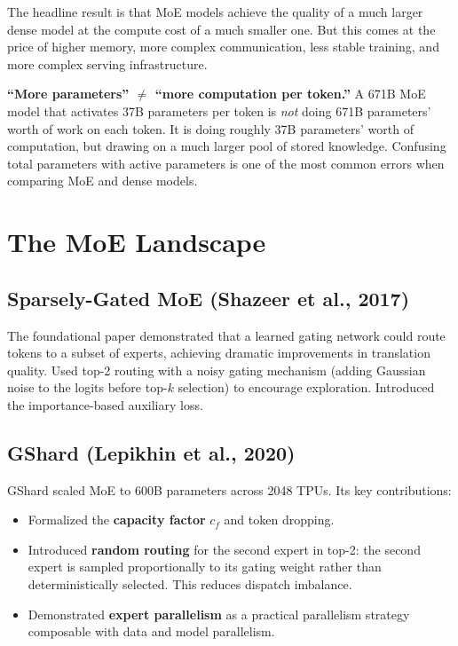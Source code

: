 The headline result is that MoE models achieve the quality of a much larger dense model at the compute cost of a much smaller one. But this comes at the price of higher memory, more complex communication, less stable training, and more complex serving infrastructure.

\begin{warningbox}
\textbf{``More parameters'' $\neq$ ``more computation per token.''} A 671B MoE model that activates 37B parameters per token is \emph{not} doing 671B parameters' worth of work on each token. It is doing roughly 37B parameters' worth of computation, but drawing on a much larger pool of stored knowledge. Confusing total parameters with active parameters is one of the most common errors when comparing MoE and dense models.
\end{warningbox}

\section{The MoE Landscape}
\label{ch:13:sec:landscape}

\subsection{Sparsely-Gated MoE (Shazeer et al., 2017)}
The foundational paper \cite{moe_2017} demonstrated that a learned gating network could route tokens to a subset of experts, achieving dramatic improvements in translation quality. Used top-2 routing with a noisy gating mechanism (adding Gaussian noise to the logits before top-$k$ selection) to encourage exploration. Introduced the importance-based auxiliary loss.

\subsection{GShard (Lepikhin et al., 2020)}
GShard \cite{gshard2020} scaled MoE to 600B parameters across 2048 TPUs. Its key contributions:
\begin{itemize}
  \item Formalized the \textbf{capacity factor} $c_f$ and token dropping.
  \item Introduced \textbf{random routing} for the second expert in top-2: the second expert is sampled proportionally to its gating weight rather than deterministically selected. This reduces dispatch imbalance.
  \item Demonstrated \textbf{expert parallelism} as a practical parallelism strategy composable with data and model parallelism.
\end{itemize}

